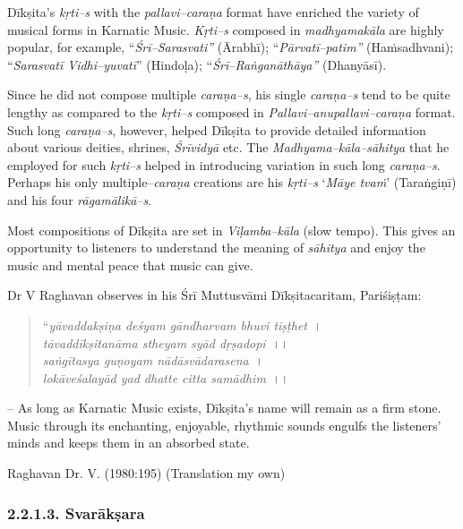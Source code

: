 Dīkṣita’s \textit{kṛti–s} with the \textit{pallavi–caraṇa} format have enriched the variety of musical forms in Karnatic Music. \textit{Kṛti–s} composed in \textit{madhyamakāla} are highly popular, for example, “\textit{Śrī–Sarasvati”} (Ārabhī); “\textit{Pārvatī–patim”} (Haṁsadhvani); “\textit{Sarasvatī Vidhi–yuvatī}” (Hindoḷa); “\textit{Śrī–Raṅganāthāya”} (Dhanyāsī).

Since he did not compose multiple \textit{caraṇa–s}, his single \textit{caraṇa–s} tend to be quite lengthy as compared to the \textit{kṛti–s} composed in \textit{Pallavi–anupallavi–caraṇa} format. Such long \textit{caraṇa–s}, however, helped Dīkṣita to provide detailed information about various deities, shrines, \textit{Śrīvidyā} etc. The \textit{Madhyama–kāla–sāhitya} that he employed for such \textit{kṛti–s} helped in introducing variation in such long \textit{caraṇa–s}. Perhaps his only multiple–\textit{caraṇa} creations are his \textit{kṛti–s} ‘\textit{Māye tvaṁ}’ (Taraṅgiṇī) and his four \textit{rāgamālikā–s}.

Most compositions of Dīkṣita are set in \textit{Viḷamba–kāla} (slow tempo). This gives an opportunity to listeners to understand the meaning of \textit{sāhitya} and enjoy the music and mental peace that music can give.

Dr V Raghavan observes in his Śrī Muttusvāmi Dīkṣitacaritam, Pariśiṣṭam:

\begin{verse}
“\textit{yāvaddakṣiṇa deśyam gāndharvam bhuvi tiṣṭhet}~।\\\textit{tāvaddīkṣitanāma stheyam syād dṛṣadopi}~।।\\\textit{saṅgītasya guṇoyam nādāsvādarasena}~।\\\textit{lokāveśalayād yad dhatte citta samādhim}~।।
\end{verse}

– As long as Karnatic Music exists, Dīkṣita’s name will remain as a firm stone. Music through its enchanting, enjoyable, rhythmic sounds engulfs the listeners’ minds and keeps them in an absorbed state.

\begin{flushright}
Raghavan Dr. V. (1980:195) (Translation my own)
\end{flushright}


\subsubsection*{2.2.1.3. Svarākṣara}

